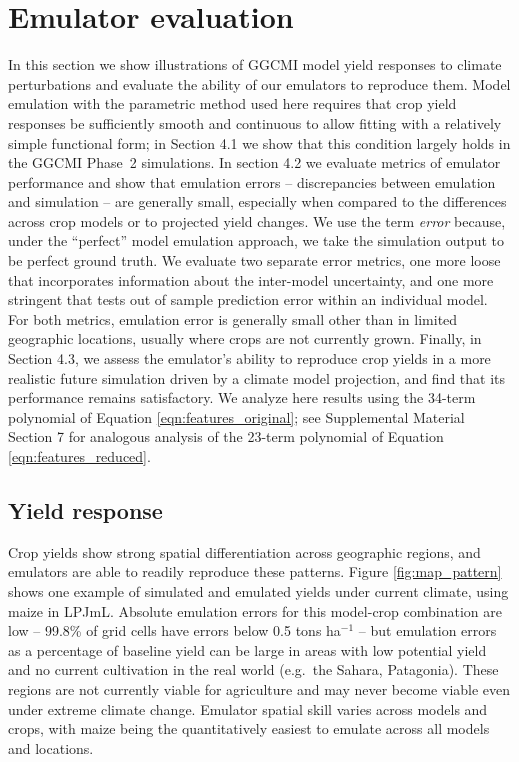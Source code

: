\documentclass[gmdd]{copernicus} %
\begin{document}
\section{Emulator evaluation}
\label{S:4}
In this section we show illustrations of GGCMI model yield responses to climate perturbations and evaluate the ability of our emulators to reproduce them.   
Model emulation with the parametric method used here requires that crop yield responses be sufficiently smooth and continuous to allow fitting with a relatively simple functional form; in Section 4.1 we show that this condition largely holds in the GGCMI Phase~2 simulations. 
In section 4.2 we evaluate metrics of emulator performance and show that emulation errors -- discrepancies between emulation and simulation -- are generally small, especially when compared to the differences across crop models or to projected yield changes. We use the term \textit{error} because, under the ``perfect'' model emulation approach, we take the simulation output to be perfect ground truth.
We evaluate two separate error metrics, one more loose that incorporates information about the inter-model uncertainty, and one more stringent that tests out of sample prediction error within an individual model.
For both metrics, emulation error is generally small other than in limited geographic locations, usually where crops are not currently grown. 
Finally, in Section 4.3, we assess the emulator's ability to reproduce crop yields in a more realistic future simulation driven by a climate model projection, and find that its performance remains satisfactory.
We analyze here results using the 34-term polynomial of Equation \ref{eqn:features_original}; see Supplemental Material Section 7 for analogous analysis of the 23-term polynomial of Equation \ref{eqn:features_reduced}.


\subsection{Yield response}
\label{S:4.1}
Crop yields show strong spatial differentiation across geographic regions, and emulators are able to readily reproduce these patterns. Figure \ref{fig:map_pattern} shows one example of simulated and emulated yields under current climate, using maize in LPJmL. Absolute emulation errors for this model-crop combination are low --  99.8\% of grid cells  have errors below 0.5 tons ha$^{-1}$ -- but 
emulation errors as a percentage of baseline yield can be large in areas with low potential yield and no current cultivation in the real world (e.g.\ the Sahara, Patagonia).
These regions are not currently viable for agriculture and may never become viable even under extreme climate change.  
Emulator spatial skill varies across models and crops, with maize being the quantitatively easiest to emulate across all models and locations.
\end{document}
